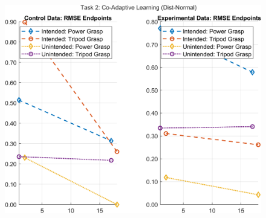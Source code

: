 \documentclass[12pt]{article}
\newcommand\figWidth{7in}
\begin{document}
\begin{figure}
    \includegraphics[width = \figWidth]{t2-spaghetti-dnorm.png}
\end{figure}
\end{document}
